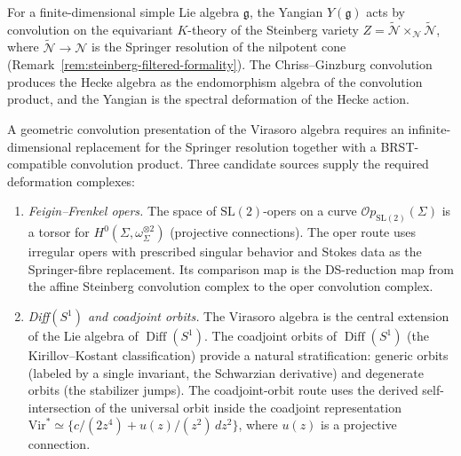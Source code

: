 \begin{remark}
\label{rem:virasoro-steinberg}
For a finite-dimensional simple Lie algebra $\mathfrak{g}$, the
Yangian $Y(\mathfrak{g})$ acts by convolution on the equivariant
$K$-theory of the Steinberg variety
$Z = \widetilde{\mathcal{N}} \times_{\mathcal{N}}
\widetilde{\mathcal{N}}$, where
$\widetilde{\mathcal{N}} \to \mathcal{N}$ is the Springer resolution
of the nilpotent cone
(Remark~\ref{rem:steinberg-filtered-formality}). The
Chriss--Ginzburg convolution produces the Hecke algebra as the
endomorphism algebra of the convolution product, and the Yangian is
the spectral deformation of the Hecke action.

A geometric convolution presentation of the Virasoro algebra
requires an infinite-dimensional replacement for the Springer
resolution together with a BRST-compatible convolution product.
Three candidate sources supply the required deformation complexes:
\begin{enumerate}[label=\textup{(\roman*)}]
\item \emph{Feigin--Frenkel opers.}\;
 The space of $\mathrm{SL}(2)$-opers on a curve
 $\mathcal{O}p_{\mathrm{SL}(2)}(\Sigma)$ is a
 torsor for $H^0(\Sigma, \omega_\Sigma^{\otimes 2})$
 (projective connections). The oper route uses irregular opers with
 prescribed singular behavior and Stokes data as the Springer-fibre
 replacement. Its comparison map is the DS-reduction map from the
 affine Steinberg convolution complex to the oper convolution complex.

\item \emph{Diff$(S^1)$ and coadjoint orbits.}\;
 The Virasoro algebra is the central extension of the
 Lie algebra of $\operatorname{Diff}(S^1)$. The
 coadjoint orbits of $\operatorname{Diff}(S^1)$
 (the Kirillov--Kostant classification) provide a
 natural stratification: generic orbits (labeled by
 a single invariant, the Schwarzian derivative) and
 degenerate orbits (the stabilizer jumps). The coadjoint-orbit route
 uses the derived self-intersection of the universal orbit inside
 the coadjoint representation
 $\mathrm{Vir}^* \simeq
 \{c/(2z^4) + u(z)/(z^2)\,dz^2\}$,
 where $u(z)$ is a projective connection.


\end{enumerate}
\end{remark}
